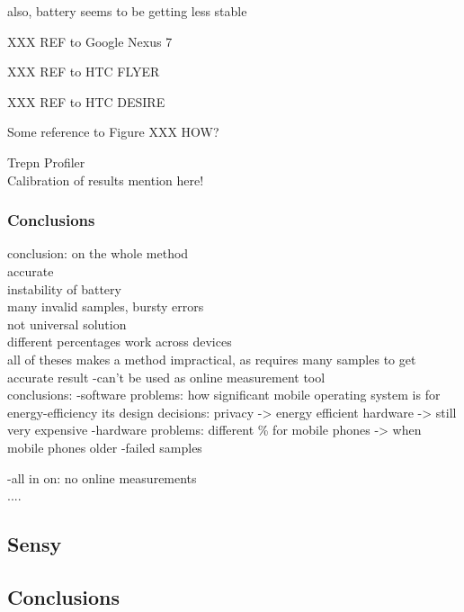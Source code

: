 	also, battery seems to be getting less stable
	
	XXX REF to Google Nexus 7
	

	XXX REF to HTC FLYER

	XXX REF to HTC DESIRE



Some reference to Figure XXX HOW?





	Trepn Profiler\\
	
	
	
	Calibration of results mention here!\\
   		
   
\subsubsection{Conclusions}   
conclusion: on the whole method\\
	accurate\\
	instability of battery\\
		many invalid samples, bursty errors\\
	not universal solution\\
		different percentages work across devices\\
	all of theses makes a method impractical, as requires many samples to get accurate result
		-can't be used as online measurement tool\\
		
conclusions:
	-software problems:
		how significant mobile operating system is for energy-efficiency
			its design decisions:
				privacy ->
				energy efficient hardware -> still very expensive
	-hardware problems:
		different \% for mobile phones  -> when mobile phones older
	-failed samples

	-all in on:
		no online measurements\\
		....\\
\subsection{Sensy}
\subsection{Conclusions}